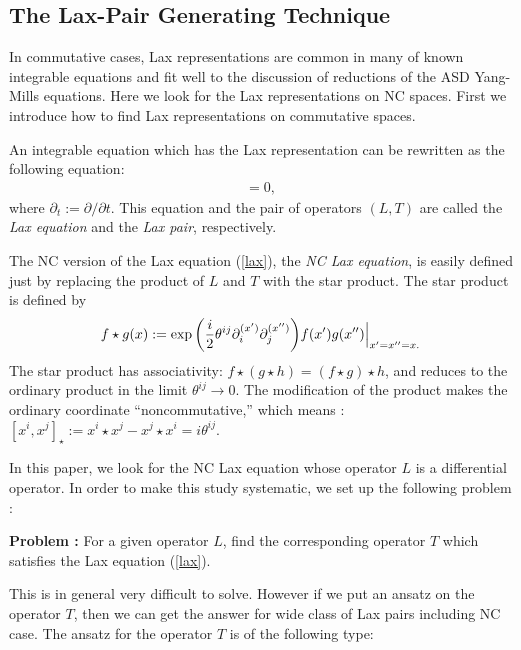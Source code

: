 \documentclass[a4paper,12pt]{article}\setlength{\topmargin}{-1cm}
\begin{document}
\subsection{The Lax-Pair Generating Technique}

In commutative cases, 
Lax representations are
common in many of known integrable equations
and fit well to the discussion of reductions 
of the ASD Yang-Mills equations.
Here we look for the Lax representations on NC spaces.
First we introduce how to find Lax representations on commutative spaces.

An integrable equation which has the Lax representation
can be rewritten as the following equation:
\begin{eqnarray}
[L,T+\partial_t]=0,
\label{lax}
\end{eqnarray}
where $\partial_t:=\partial/\partial t$.
This equation and the pair of operators $(L,T)$ are 
called the {\it Lax equation} and the {\it Lax pair}, respectively.

The NC version of the Lax equation (\ref{lax}),
the {\it NC Lax equation}, is easily defined
just by replacing the product of $L$ and $T$ with the star product.
The star product is defined by
\begin{eqnarray}
f\star g(x):=
\exp{\left(\frac{i}{2}\theta^{ij}\partial^{(x^\prime)}_i
\partial^{(x^{\prime\prime})}_j\right)}
f(x^\prime)g(x^{\prime\prime})\Big{\vert}_{x^{\prime}
=x^{\prime\prime}=x.}%
\end{eqnarray}
The star product has associativity: $f\star (g\star h)=(f\star g)\star h$,
and reduces to the ordinary product in the limit $\theta^{ij}\rightarrow 0$.
The modification of the product  makes the ordinary
coordinate ``noncommutative,'' 
which means : $[x^i,x^j]_\star :=x^i\star x^j-x^j\star x^i=i\theta^{ij}$.

In this paper, we look for the NC Lax equation
whose operator $L$ is a differential operator.
In order to make this study systematic,
we set up the following problem :

\vspace{3mm}
\noindent
{\bf Problem :}
For a given operator $L$, 
find the corresponding operator $T$
which satisfies the Lax equation (\ref{lax}).
\vspace{3mm}

This is in general very difficult to solve.
However if we put an ansatz on the operator $T$,
then we can get the answer 
for wide class of Lax pairs
including NC case.
The ansatz for the operator $T$ is of the following type:
\end{document}
